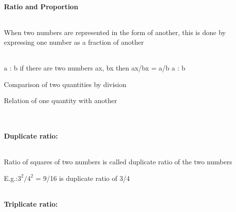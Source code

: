 \documentclass{article}
\begin{document}
	\noindent \begin{center}
		{\Large \textbf{Ratio and Proportion \\}}
	\end{center}




\noindent 

\noindent 

\noindent 

\noindent 

\noindent  \\ When two numbers are represented in the form of another, this is done by expressing one number as a fraction of another

\noindent 

\noindent \\  a : b if there are two numbers ax, bx then ax/bx = a/b a : b

\noindent 

\noindent 

\noindent Comparison of two quantities by division

\noindent 

\noindent 

\noindent Relation of one quantity with another

\noindent 

\noindent 

\noindent 

\noindent 

\noindent \\  

\noindent \\  
\textbf{Duplicate ratio:}

\noindent 

\noindent 

\noindent \\  Ratio of squares of two numbers is called duplicate ratio of the two numbers

\noindent 

\noindent 

\noindent E.g.:$  3^{2}/4^{2} $ = 9/16 is duplicate ratio of 3/4

\noindent 

\noindent 

\noindent 

\noindent 

\noindent 

\noindent  \\ \textbf{Triplicate ratio:}
\end{document}
